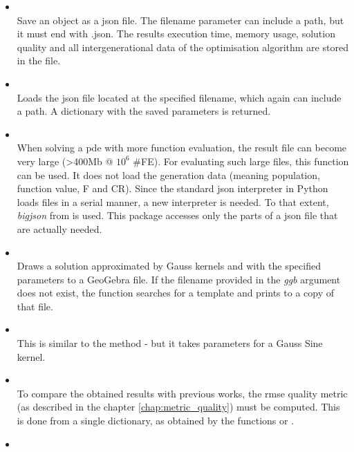 \documentclass[.\jobname.tex]{subfiles}
\begin{document}
\begin{itemize}
	\item 
	 \\
	Save an  object as a \gls{json} file. The filename parameter can include a path, but it must end with .json. The results execution time, memory usage, solution quality and all intergenerational data of the optimisation algorithm are stored in the file. 
	\item {} \\
	Loads the \gls{json} file located at the specified filename, which again can include a path. A dictionary with the saved  parameters is returned. 
	\item 
	 \\
	When solving a \gls{pde} with more function evaluation, the result file can become very large (>400Mb @ $10^6$ \#FE). For evaluating such large files, this function can be used. It does not load the generation data (meaning population, function value, F and CR). Since the standard \gls{json} interpreter in Python loads files in a serial manner, a new interpreter is needed. To that extent, \textit{bigjson} from \cite{heino_henubigjson_2020} is used. This package accesses only the parts of a \gls{json} file that are actually needed.
	\item {} \\
	Draws a solution approximated by Gauss kernels and with the specified parameters to a GeoGebra file. If the filename provided in the \textit{ggb} argument does not exist, the function searches for a template and prints to a copy of that file. 
	\item {} \\
	This is similar to the  method - but it takes parameters for a Gauss Sine kernel. 
	\item 
	 \\
	To compare the obtained results with previous works, the \gls{rmse} quality metric (as described in the chapter \ref{chap:metric_quality}) must be computed. This is done from a single dictionary, as obtained by the functions  or .
	\item 
	 \\

\end{itemize}
\end{document}
